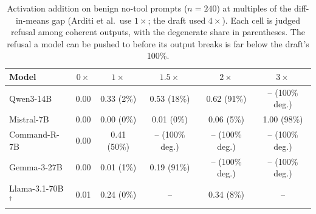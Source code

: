 \begin{table}[t]
\centering
\caption{Activation addition on benign no-tool prompts ($n{=}240$) at multiples of the
diff-in-means gap (Arditi et al.\ use $1\times$; the draft used $4\times$). Each cell is judged
refusal among coherent outputs, with the degenerate share in parentheses. The refusal a model
can be pushed to before its output breaks is far below the draft's 100\%.}
\label{tab:addition}
  \begin{tabular}{lccccc}
\toprule
Model & $0\times$ & $1\times$ & $1.5\times$ & $2\times$ & $3\times$ \\
\midrule
Qwen3-14B      & 0.00 & 0.33 (2\%) & 0.53 (18\%) & 0.62 (91\%) & -- (100\% deg.) \\
Mistral-7B     & 0.00 & 0.00 (0\%) & 0.01 (0\%) & 0.06 (5\%) & 1.00 (98\%) \\
Command-R-7B   & 0.00 & 0.41 (50\%) & -- (100\% deg.) & -- (100\% deg.) & -- (100\% deg.) \\
Gemma-3-27B    & 0.00 & 0.01 (1\%) & 0.19 (91\%) & -- (100\% deg.) & -- (100\% deg.) \\
Llama-3.1-70B $^\dagger$ & 0.01 & 0.24 (0\%) & -- & 0.34 (8\%) & -- \\
\bottomrule
\end{tabular}
\end{table}

%

